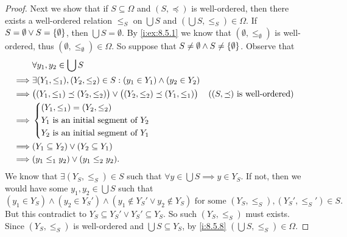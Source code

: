 \begin{proof}
  Next we show that if \(S \subseteq \Omega\) and \((S, \preceq)\) is well-ordered, then there exists a well-ordered relation \(\leq_S\) on \(\bigcup S\) and \((\bigcup S, \leq_S) \in \Omega\).
  If \(S = \emptyset \lor S = \left\lbrace\emptyset\right\rbrace\), then \(\bigcup S = \emptyset\).
  By \cref{i:ex:8.5.1} we know that \((\emptyset, \leq_{\emptyset})\) is well-ordered, thus \((\emptyset, \leq_{\emptyset}) \in \Omega\).
  So suppose that \(S \neq \emptyset \land S \neq \left\lbrace\emptyset\right\rbrace\).
  Observe that
  \begin{align*}
             & \forall y_1, y_2 \in \bigcup S                                                                                                                  \\
    \implies & \exists (Y_1, \leq_1), (Y_2, \leq_2) \in S : (y_1 \in Y_1) \land (y_2 \in Y_2)                                                                  \\
    \implies & \big((Y_1, \leq_1) \preceq (Y_2, \leq_2)\big) \lor \big((Y_2, \leq_2) \preceq (Y_1, \leq_1)\big) &  & \text{(\((S, \preceq)\) is well-ordered)} \\
    \implies & \begin{dcases}
                 (Y_1, \leq_1) = (Y_2, \leq_2)             \\
                 Y_1 \text{ is an initial segment of } Y_2 \\
                 Y_2 \text{ is an initial segment of } Y_1
               \end{dcases}                                                                                                       \\
    \implies & (Y_1 \subseteq Y_2) \lor (Y_2 \subseteq Y_1)                                                                                                    \\
    \implies & (y_1 \leq_1 y_2) \lor (y_1 \leq_2 y_2).
  \end{align*}
  We know that \(\exists (Y_S, \leq_S) \in S\) such that \(\forall y \in \bigcup S \implies y \in Y_S\).
  If not, then we would have some \(y_1, y_2 \in \bigcup S\) such that
  \[
    (y_1 \in Y_S) \land (y_2 \in Y_S') \land (y_1 \notin Y_S' \lor y_2 \notin Y_S) \text{ for some } (Y_S, \leq_S), (Y_S', \leq_S') \in S.
  \]
  But this contradict to \(Y_S \subseteq Y_S' \lor Y_S' \subseteq Y_S\).
  So such \((Y_S, \leq_S)\) must exists.
  Since \((Y_S, \leq_S)\) is well-ordered and \(\bigcup S \subseteq Y_S\), by \cref{i:8.5.8} \((\bigcup S, \leq_S) \in \Omega\).


\end{proof}
